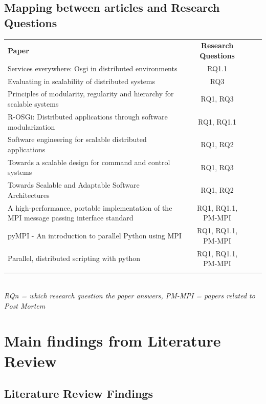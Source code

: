 \documentclass{article}
\begin{document}
\subsection{Mapping between articles and Research Questions}
\begin{tabular}{p{8cm} c c r}
  \rowcolor[gray]{0.5}
  {\bf Paper} & {\bf Research Questions} \\
  Services everywhere: Osgi in distributed environments & RQ1.1 \\
  Evaluating in scalability of distributed systems & RQ3 \\
  Principles of modularity, regularity and hierarchy for scalable systems & RQ1, RQ3 \\
  R-OSGi: Distributed applications through software modularization & RQ1, RQ1.1 \\
  Software engineering for scalable distributed applications & RQ1, RQ2 \\
  Towards a scalable design for command and control systems & RQ1, RQ3 \\
  Towards Scalable and Adaptable Software Architectures & RQ1, RQ2 \\
  A high-performance, portable implementation of the MPI message passing interface standard & RQ1, RQ1.1, PM-MPI \\
  pyMPI - An introduction to parallel Python using MPI & RQ1, RQ1.1, PM-MPI \\
  Parallel, distributed scripting with python & RQ1, RQ1.1, PM-MPI \\
\rowcolor[gray]{0.5}
\end{tabular}
\\\small \emph{RQ{n} = which research question the paper answers,
 PM-MPI = papers related to Post Mortem }

\section{Main findings from Literature Review}

\subsection{Literature Review Findings}
\end{document}
